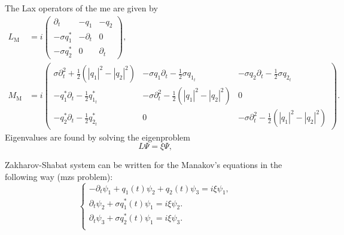 The Lax operators of the \acrlong{me} are given by 
\begin{align}
    L_{\text{M}} &= i\begin{pmatrix} \partial_t & -q_1 & -q_2 \\
    -\sigma q_1^* & -\partial_t & 0 \\
    -\sigma q_2^* & 0 & \partial_t \end{pmatrix}, \\
    M_{\text{M}} &= i\begin{pmatrix}  \sigma \partial^2_t +  \frac{1}{2} (|q_1|^2 - |q_2|^2) & -\sigma q_1 \partial_t - \frac{1}{2} \sigma  q_{1_t} & -\sigma q_2 \partial_t - \frac{1}{2} \sigma q_{2_t} \\
    - q_1^* \partial_t - \frac{1}{2} q_{1_t}^* & - \sigma \partial^2_t -  \frac{1}{2} (|q_1|^2 - |q_2|^2) & 0 \\
    - q_2^* \partial_t - \frac{1}{2} q_{2_t}^* & 0 & - \sigma \partial^2_t -  \frac{1}{2} (|q_1|^2 - |q_2|^2) \end{pmatrix}.
\end{align}
Eigenvalues are found by solving the eigenproblem
\begin{equation}
    L\Psi = \xi \Psi {,}
\end{equation}

Zakharov-Shabat system can be written for the Manakov's equations in the following way (\acrfull{mzs} problem):
\begin{equation}
\left\{
\begin{aligned}
	- \partial_{t} \psi_1 + q_1(t) \psi_2 + q_2(t) \psi_3 = i \xi \psi_1, \\
	\partial_{t} \psi_2 + \sigma q_1^{*}(t) \psi_1 = i \xi \psi_2. \\
 \partial_{t} \psi_3 + \sigma q_2^{*}(t) \psi_1 = i \xi \psi_3. \\
\end{aligned}
\right.
\label{eq:zs_manakov}
\end{equation}

